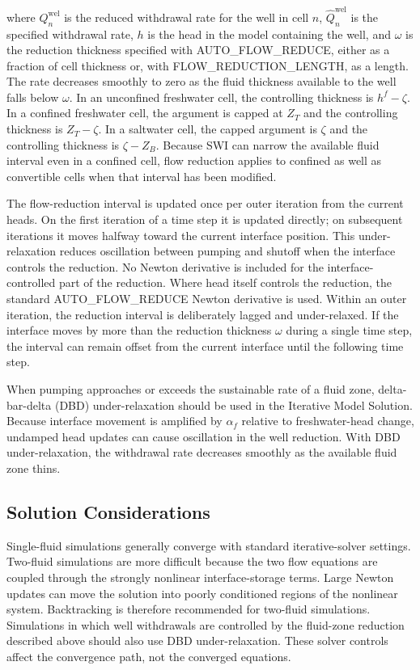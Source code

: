 \noindent where $Q_{n}^{\mathrm{wel}}$ is the reduced withdrawal rate for the well in cell $n$, $\hat Q_{n}^{\mathrm{wel}}$ is the specified withdrawal rate, $h$ is the head in the model containing the well, and $\omega$ is the reduction thickness specified with AUTO\_FLOW\_REDUCE, either as a fraction of cell thickness or, with FLOW\_REDUCTION\_LENGTH, as a length. The rate decreases smoothly to zero as the fluid thickness available to the well falls below $\omega$. In an unconfined freshwater cell, the controlling thickness is $h^{f}-\zeta$. In a confined freshwater cell, the argument is capped at $Z_{T}$ and the controlling thickness is $Z_{T}-\zeta$. In a saltwater cell, the capped argument is $\zeta$ and the controlling thickness is $\zeta-Z_{B}$. Because SWI can narrow the available fluid interval even in a confined cell, flow reduction applies to confined as well as convertible cells when that interval has been modified.

The flow-reduction interval is updated once per outer iteration from the current heads. On the first iteration of a time step it is updated directly; on subsequent iterations it moves halfway toward the current interface position. This under-relaxation reduces oscillation between pumping and shutoff when the interface controls the reduction. No Newton derivative is included for the interface-controlled part of the reduction. Where head itself controls the reduction, the standard AUTO\_FLOW\_REDUCE Newton derivative is used. Within an outer iteration, the reduction interval is deliberately lagged and under-relaxed. If the interface moves by more than the reduction thickness $\omega$ during a single time step, the interval can remain offset from the current interface until the following time step.

When pumping approaches or exceeds the sustainable rate of a fluid zone, delta-bar-delta (DBD) under-relaxation should be used in the Iterative Model Solution. Because interface movement is amplified by $\alpha_{f}$ relative to freshwater-head change, undamped head updates can cause oscillation in the well reduction. With DBD under-relaxation, the withdrawal rate decreases smoothly as the available fluid zone thins.

\subsection{Solution Considerations}

Single-fluid simulations generally converge with standard iterative-solver settings. Two-fluid simulations are more difficult because the two flow equations are coupled through the strongly nonlinear interface-storage terms. Large Newton updates can move the solution into poorly conditioned regions of the nonlinear system. Backtracking is therefore recommended for two-fluid simulations. Simulations in which well withdrawals are controlled by the fluid-zone reduction described above should also use DBD under-relaxation. These solver controls affect the convergence path, not the converged equations.

